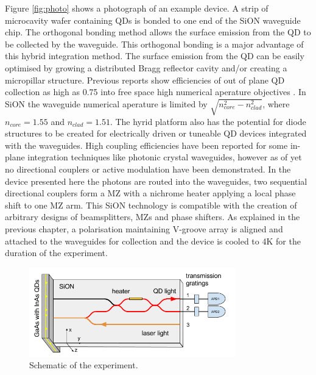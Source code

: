 Figure \ref{fig:photo} shows a photograph of an example device. A strip of
microcavity wafer containing QDs is bonded to one end of the SiON waveguide
chip. The orthogonal bonding method allows the surface emission from the QD to
be collected by the waveguide. This orthogonal bonding is a major advantage of
this hybrid integration method. The surface emission from the QD can be easily
optimised by growing a distributed Bragg reflector cavity and/or creating a
micropillar structure. Previous reports show efficiencies of out of plane QD
collection as high as 0.75 into free space high numerical aperature objectives
\cite{claudon2010highly, munsch2013dielectric}. In SiON the waveguide numerical
aperature is limited by $\sqrt{n_{core}^2 - n_{clad}^2}$, where $n_{core} =
\mathrm{1.55}$ and $n_{clad} = \mathrm{1.51}$. The hyrid platform also has the
potential for diode structures to be created for electrically driven or tuneable
QD devices integrated with the waveguides. High coupling efficiencies have been
reported for some in-plane integration techniques like photonic crystal
waveguides\cite{schwagmann2011chip, arcari2014near}, however as of yet no
directional couplers or active modulation have been demonstrated. In the device
presented here the photons are routed into the waveguides, two sequential
directional couplers form a MZ with a nichrome heater applying a local phase
shift to one MZ arm. This SiON technology is compatible with the creation of
arbitrary designs of beamsplitters, MZs and phase shifters. As explained in the
previous chapter, a polarisation maintaining V-groove array is aligned and
attached to the waveguides for collection and the device is cooled to 4K for the
duration of the experiment.

\begin{figure}[h!] \begin{center}
\includegraphics[width=0.8\textwidth]{images/hyb.png} \caption{Schematic of the
experiment.} \label{fig:schem} \end{center} \end{figure}


